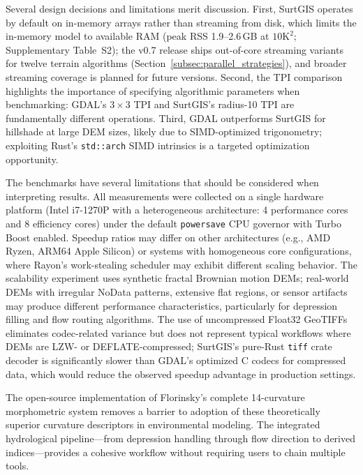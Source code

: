 \documentclass[preprint,review,12pt,authoryear]{elsarticle}
\begin{document}
Several design decisions and limitations merit discussion. First, SurtGIS operates by default on in-memory arrays rather than streaming from disk, which limits the in-memory model to available RAM (peak RSS 1.9--2.6\,GB at $10\text{K}^2$; Supplementary Table~S2); the v0.7 release ships out-of-core streaming variants for twelve terrain algorithms (Section~\ref{subsec:parallel_strategies}), and broader streaming coverage is planned for future versions. Second, the TPI comparison highlights the importance of specifying algorithmic parameters when benchmarking: GDAL's $3 \times 3$ TPI and SurtGIS's radius-10 TPI are fundamentally different operations. Third, GDAL outperforms SurtGIS for hillshade at large DEM sizes, likely due to SIMD-optimized trigonometry; exploiting Rust's \texttt{std::arch} SIMD intrinsics is a targeted optimization opportunity.

The benchmarks have several limitations that should be considered when interpreting results. All measurements were collected on a single hardware platform (Intel i7-1270P with a heterogeneous architecture: 4 performance cores and 8 efficiency cores) under the default \texttt{powersave} CPU governor with Turbo Boost enabled. Speedup ratios may differ on other architectures (e.g., AMD Ryzen, ARM64 Apple Silicon) or systems with homogeneous core configurations, where Rayon's work-stealing scheduler may exhibit different scaling behavior. The scalability experiment uses synthetic fractal Brownian motion DEMs; real-world DEMs with irregular NoData patterns, extensive flat regions, or sensor artifacts may produce different performance characteristics, particularly for depression filling and flow routing algorithms. The use of uncompressed Float32 GeoTIFFs eliminates codec-related variance but does not represent typical workflows where DEMs are LZW- or DEFLATE-compressed; SurtGIS's pure-Rust \texttt{tiff} crate decoder is significantly slower than GDAL's optimized C codecs for compressed data, which would reduce the observed speedup advantage in production settings.

The open-source implementation of Florinsky's complete 14-curvature morphometric system \citep{florinsky2025} removes a barrier to adoption of these theoretically superior curvature descriptors in environmental modeling. The integrated hydrological pipeline---from depression handling through flow direction to derived indices---provides a cohesive workflow without requiring users to chain multiple tools.
\end{document}
